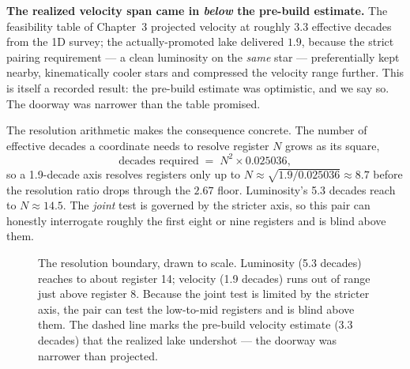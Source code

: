 \documentclass[11pt, letterpaper, openany]{book}
\begin{document}
\begin{warningbox}
\textbf{The realized velocity span came in \emph{below} the pre-build estimate.} The feasibility
table of Chapter~3 projected velocity at roughly $3.3$ effective decades from the 1D survey; the
actually-promoted lake delivered $1.9$, because the strict pairing requirement --- a clean
luminosity on the \emph{same} star --- preferentially kept nearby, kinematically cooler stars and
compressed the velocity range further. This is itself a recorded result: the pre-build estimate
was optimistic, and we say so. The doorway was narrower than the table promised.
\end{warningbox}

The resolution arithmetic makes the consequence concrete. The number of effective decades a
coordinate needs to resolve register $N$ grows as its square,
\[
\text{decades required} \;=\; N^2 \times 0.025036,
\]
so a 1.9-decade axis resolves registers only up to $N \approx \sqrt{1.9 / 0.025036} \approx 8.7$
before the resolution ratio drops through the $2.67$ floor. Luminosity's 5.3 decades reach to
$N \approx 14.5$. The \emph{joint} test is governed by the stricter axis, so this pair can
honestly interrogate roughly the first eight or nine registers and is blind above them.

\begin{figure}[H]
\centering
{}
\caption{The resolution boundary, drawn to scale. Luminosity (5.3 decades) reaches to about
register 14; velocity (1.9 decades) runs out of range just above register 8. Because the joint
test is limited by the stricter axis, the pair can test the low-to-mid registers and is blind
above them. The dashed line marks the pre-build velocity estimate (3.3 decades) that the realized
lake undershot --- the doorway was narrower than projected.}
\end{figure}
\end{document}
